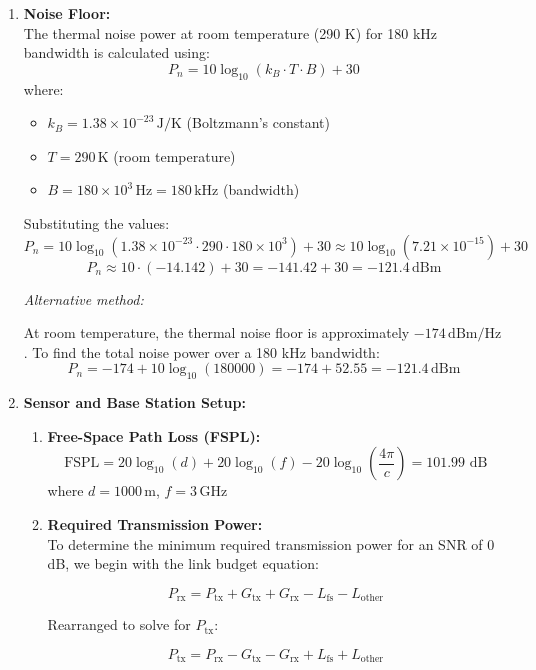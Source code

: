 \documentclass[12pt]{article}
\begin{document}
\begin{enumerate}
\item \textbf{Noise Floor:} \\
The thermal noise power at room temperature (290 K) for 180 kHz bandwidth is calculated using:
\[
P_n = 10 \log_{10}(k_B \cdot T \cdot B) + 30
\]
where:
\begin{itemize}
    \item \(k_B = 1.38 \times 10^{-23} \, \text{J/K}\) (Boltzmann's constant)
    \item \(T = 290 \, \text{K}\) (room temperature)
    \item \(B = 180 \times 10^3 \, \text{Hz} = 180\, \text{kHz}\) (bandwidth)
\end{itemize}

Substituting the values:
\[
P_n = 10 \log_{10}(1.38 \times 10^{-23} \cdot 290 \cdot 180 \times 10^3) + 30
\approx 10 \log_{10}(7.21 \times 10^{-15}) + 30
\]
\[
P_n \approx 10 \cdot (-14.142) + 30 = -141.42 + 30 = \boxed{-121.4 \, \text{dBm}}
\]

\vspace{0.5em}
\noindent\textit{Alternative method:}

At room temperature, the thermal noise floor is approximately \(-174 \, \text{dBm/Hz}\). To find the total noise power over a 180 kHz bandwidth:
\[
P_n = -174 + 10 \log_{10}(180 000)
= -174 + 52.55 = \boxed{-121.4 \, \text{dBm}}
\]

    \item \textbf{Sensor and Base Station Setup:}
    \begin{enumerate}
        \item \textbf{Free-Space Path Loss (FSPL):}
        \[
        \text{FSPL} = 20\log_{10}(d) + 20\log_{10}(f) - 20\log_{10}\left(\frac{4\pi}{c}\right) = 101.99 \text{ dB}
        \]
        where \(d = 1000 \, \text{m}\), \(f = 3 \, \text{GHz}\)

        \item \textbf{Required Transmission Power:} \\

        To determine the minimum required transmission power for an SNR of 0 dB, we begin with the link budget equation:

        \[
        P_{\text{rx}} = P_{\text{tx}} + G_{\text{tx}} + G_{\text{rx}} - L_{\text{fs}} - L_{\text{other}}
        \]

        Rearranged to solve for \( P_{\text{tx}} \):

        \[
        P_{\text{tx}} = P_{\text{rx}} - G_{\text{tx}} - G_{\text{rx}} + L_{\text{fs}} + L_{\text{other}}
        \]


\end{enumerate}
\end{enumerate}
\end{document}
